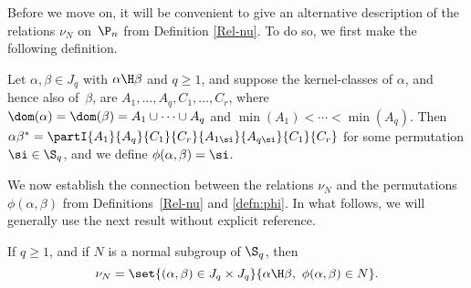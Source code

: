 Before we move on, it will be convenient to give an alternative description of the relations $\nu_N$ on~$\P_n$ from Definition \ref{Rel-nu}.  To do so, we first make the following definition.

\begin{definition}\label{defn:phi}
Let $\alpha,\beta\in J_q$ with $\alpha\H\beta$ and $q\geq1$, and suppose the kernel-classes of $\alpha$, and hence also of~$\beta$, are $A_1,\ldots,A_q,C_1,\ldots,C_r$, where $\dom(\alpha)=\dom(\beta)=A_1\cup\cdots\cup A_q$ and $\min(A_1)<\cdots<\min(A_q)$.  Then
$\alpha\beta^* = \partI{A_1}{A_q}{C_1}{C_r}{A_{1\si}}{A_{q\si}}{C_1}{C_r}$ for some permutation $\si\in\S_q$, and we define $\phi(\alpha,\beta)=\si$.
\end{definition}

We now establish the connection between the relations $\nu_N$ and the permutations $\phi(\alpha,\beta)$ from Definitions~\ref{Rel-nu} and \ref{defn:phi}.  In what follows, we will generally use the next result without explicit reference.

\begin{lemma}\label{lem:nu_phi}
If $q\geq1$, and if $N$ is a normal subgroup of $\S_q$, then
\[
\nu_N=\set{ (\alpha,\beta)\in J_q\times J_q}{\alpha\H \beta,\ \phi(\alpha,\beta)\in N}.
\]
\end{lemma}

